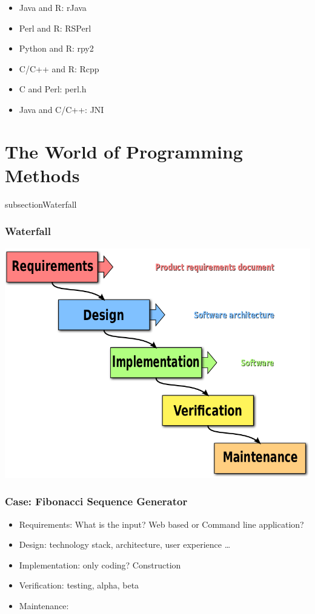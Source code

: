 \documentclass[UTF8]{beamer}
\begin{document}
\begin{frame}
  \begin{itemize}
    \item Java and R: rJava
    \item Perl and R: RSPerl
    \item Python and R: rpy2
    \item C/C++ and R: Rcpp
    \item C and Perl: perl.h
    \item Java and C/C++: JNI
  \end{itemize}
\end{frame}

\section{The World of Programming Methods}

subsection{Waterfall}
\begin{frame}
  \frametitle{Waterfall}
  \centerline{\includegraphics[height=.8\textheight]{waterflow.png}}
\end{frame}

\begin{frame}
  \frametitle{Case: Fibonacci Sequence Generator}
  \begin{itemize}
    \item Requirements: What is the input? Web based or Command line application?
    \item Design: technology stack, architecture, user experience \ldots
    \item Implementation: only coding? Construction
    \item Verification: testing, alpha, beta
    \item Maintenance:
  \end{itemize}
\end{frame}
\end{document}
